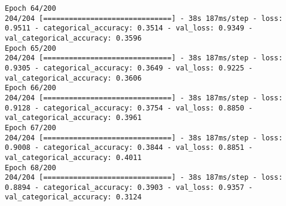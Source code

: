 \begin{lstlisting}
Epoch 64/200
204/204 [==============================] - 38s 187ms/step - loss: 0.9511 - categorical_accuracy: 0.3514 - val_loss: 0.9349 - val_categorical_accuracy: 0.3596
Epoch 65/200
204/204 [==============================] - 38s 187ms/step - loss: 0.9305 - categorical_accuracy: 0.3649 - val_loss: 0.9225 - val_categorical_accuracy: 0.3606
Epoch 66/200
204/204 [==============================] - 38s 187ms/step - loss: 0.9128 - categorical_accuracy: 0.3754 - val_loss: 0.8850 - val_categorical_accuracy: 0.3961
Epoch 67/200
204/204 [==============================] - 38s 187ms/step - loss: 0.9008 - categorical_accuracy: 0.3844 - val_loss: 0.8851 - val_categorical_accuracy: 0.4011
Epoch 68/200
204/204 [==============================] - 38s 187ms/step - loss: 0.8894 - categorical_accuracy: 0.3903 - val_loss: 0.9357 - val_categorical_accuracy: 0.3124
\end{lstlisting}

